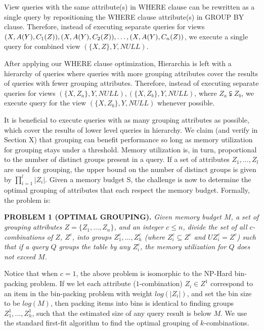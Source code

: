 View queries with the same attribute(s) in WHERE clause can be rewritten as a single query by repositioning the WHERE clause attribute(s) in GROUP BY clause. Therefore, instead of executing separate queries for views $(X, A(Y), C_1(Z)), (X, A(Y), C_2(Z)), \ldots, \\(X, A(Y), C_n(Z))$, we execute a single query for combined view $(\{X, Z\}, Y, NULL)$. 

After applying our WHERE clause optimization, Hierarchia is left with a hierarchy of queries where queries with more grouping attributes cover the results of queries with fewer grouping attributes. Therefore, instead of executing separate queries for views $(\{X, Z_a\}, Y, NULL), (\{X, Z_b\}, Y, NULL)$, where $Z_a \subsetneqq Z_b$, we execute query for the view $(\{X, Z_b\}, Y, NULL)$ whenever possible. 

It is beneficial to execute queries with as many grouping attributes as possible, which cover the results of lower level queries in hierarchy. We claim (and verify in Section X) that grouping can benefit performance so long as memory utilization for grouping stays under a threshold. Memory utilization is, in turn, proportional to the number of distinct groups present in a query. If a set of attributes $Z_1, \ldots, Z_l$ are used for grouping, the upper bound on the number of distinct groups is given by $\prod_{i=1}^{l}\lvert Z_i\rvert$. Given a memory budget S, the challenge is now to determine the optimal grouping of attributes that each respect the memory budget. Formally, the problem is:

\textbf{PROBLEM 1 (OPTIMAL GROUPING).} \emph{Given memory budget $M$, a set of grouping attributes $Z = \{Z_1, \ldots, Z_n\}$, and an integer $c \le n$, divide the set of all $c$-combinations of $Z$, $Z^c$, into groups $Z^c_1, \ldots, Z^c_h$ (where $Z^c_i \subseteq Z^c$ and $U Z^c_i = Z^c$) such that if a query $Q$ groups the table by any $Z^c_i$, the memory utilization for $Q$ does not exceed $M$.}

Notice that when $c = 1$, the above problem is isomorphic to the NP-Hard bin-packing problem. If we let each attribute ($1$-combination) $Z_i \in Z^1$ correspond to an item in the bin-packing problem with weight $log(\lvert Z_i\rvert)$, and set the bin size to be $log(M)$, then packing items into bins is identical to finding groups $Z^1_1, \ldots, Z^1_h$, such that the estimated size of any query result is below $M$. We use the standard first-fit algorithm to find the optimal grouping of $k$-combinations.

